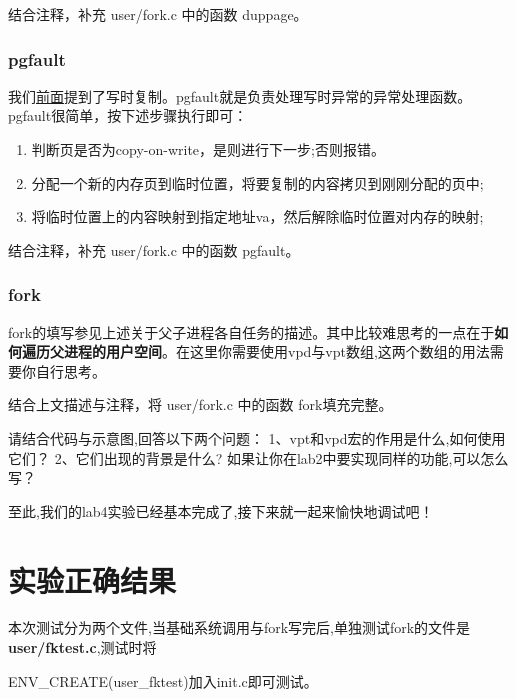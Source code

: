 \begin{exercise}
 结合注释，补充 user/fork.c 中的函数 duppage。
\end{exercise}

\subsubsection{pgfault}
我们\hyperref[页保护与处理]{前面}提到了写时复制。pgfault就是负责处理写时异常的异常处理函数。
pgfault很简单，按下述步骤执行即可：
\begin{enumerate}
	\item 判断页是否为copy-on-write，是则进行下一步;否则报错。
	\item 分配一个新的内存页到临时位置，将要复制的内容拷贝到刚刚分配的页中;
	\item 将临时位置上的内容映射到指定地址va，然后解除临时位置对内存的映射;
\end{enumerate}

\begin{exercise}
	结合注释，补充 user/fork.c 中的函数 pgfault。
\end{exercise}

\subsubsection{fork}
fork的填写参见上述关于父子进程各自任务的描述。其中比较难思考的一点在于\textbf{如何遍历父进程的用户空间}。在这里你需要使用vpd与vpt数组,这两个数组的用法需要你自行思考。

\begin{exercise}
结合上文描述与注释，将 user/fork.c 中的函数 fork填充完整。
\end{exercise}

\begin{thinking}\label{think:vpt的使用}
	请结合代码与示意图,回答以下两个问题：
	1、vpt和vpd宏的作用是什么,如何使用它们？
	2、它们出现的背景是什么? 如果让你在lab2中要实现同样的功能,可以怎么写？
\end{thinking}

至此,我们的lab4实验已经基本完成了,接下来就一起来愉快地调试吧！

\section{实验正确结果}

本次测试分为两个文件,当基础系统调用与fork写完后,单独测试fork的文件是\textbf{user/fktest.c},测试时将

ENV\_CREATE(user\_fktest)加入init.c即可测试。

